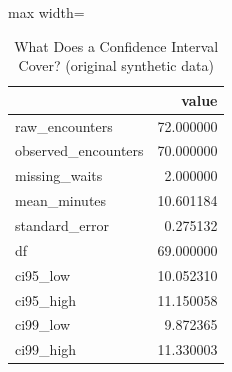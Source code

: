 \begin{table}[htbp]
\centering
\caption{What Does a Confidence Interval Cover? (original synthetic data)}
\begingroup
\small
\setlength{\tabcolsep}{6pt}
\renewcommand{\arraystretch}{1.12}
\begin{adjustbox}{max width=\linewidth}
\begin{tabular}{@{}lr@{}}
\toprule
 & value \\
\midrule
raw\_encounters & 72.000000 \\
observed\_encounters & 70.000000 \\
missing\_waits & 2.000000 \\
mean\_minutes & 10.601184 \\
standard\_error & 0.275132 \\
df & 69.000000 \\
ci95\_low & 10.052310 \\
ci95\_high & 11.150058 \\
ci99\_low & 9.872365 \\
ci99\_high & 11.330003 \\
\bottomrule
\end{tabular}
\end{adjustbox}
\endgroup
\end{table}